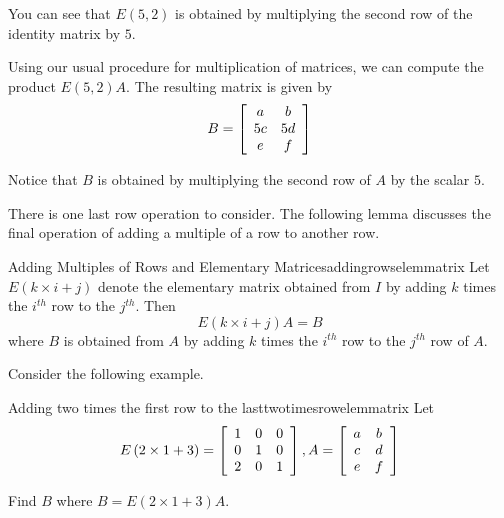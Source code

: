 \begin{solution}
You can see that $E \left(5, 2\right)$ is obtained by multiplying the second row 
of the identity matrix by $5$.

Using our usual procedure for multiplication of matrices, we can compute the product $E \left(5, 2\right)A$. The 
resulting matrix is given by 
\begin{equation*}
B
=\left[
\begin{array}{cc}
a & b \\
5c & 5d \\
e & f
\end{array}
\right]
\end{equation*}

Notice that $B$ is obtained by multiplying the second row of $A$ by the scalar $5$. 
\end{solution}

There is one last row operation to consider. The following lemma discusses the final
operation of adding a multiple of a row to another row.

\begin{lemma}{Adding Multiples of Rows and Elementary Matrices}{addingrowselemmatrix}
Let $E\left( k \times i+j\right) $ denote the elementary
matrix obtained from $I$ by adding $k$ times the $i^{th}$ row to the $j^{th}$. Then
\begin{equation*}
E\left( k \times i+j\right) A=B
\end{equation*}
where $B$ is obtained from $A$ by adding $k$ times the $i^{th}$ row to the $j^{th}$ row of $A.$
\end{lemma}

Consider the following example.

\begin{example}{Adding two times the first row to the last}{twotimesrowelemmatrix}
Let
\begin{equation*}
E\left( 2 \times 1+3\right) = \left[
\begin{array}{rrr}
1 & 0 & 0 \\
0 & 1 & 0 \\
2 & 0 & 1
\end{array}
\right], A =  \left[
\begin{array}{cc}
a & b \\
c & d \\
e & f
\end{array}
\right] 
\end{equation*}

Find $B$ where $B = E\left( 2 \times 1+3\right)A$.
\end{example}

